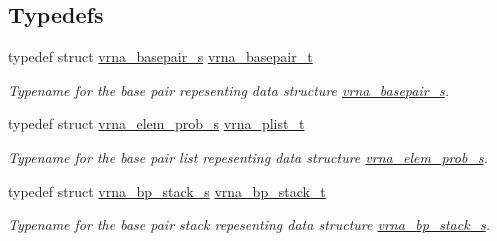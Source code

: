 \subsection*{Typedefs}
\begin{DoxyCompactItemize}
\item 
\mbox{\label{group__data__structures_gac8c5669d3fb813cacf506489689305ce}} 
typedef struct \hyperlink{group__data__structures_structvrna__basepair__s}{vrna\+\_\+basepair\+\_\+s} \hyperlink{group__data__structures_gac8c5669d3fb813cacf506489689305ce}{vrna\+\_\+basepair\+\_\+t}
\begin{DoxyCompactList}\small\item\em Typename for the base pair repesenting data structure \hyperlink{group__data__structures_structvrna__basepair__s}{vrna\+\_\+basepair\+\_\+s}. \end{DoxyCompactList}\item 
\mbox{\label{group__data__structures_ga5bd6f0d16685b1249b7c3b73049dd5dc}} 
typedef struct \hyperlink{group__struct__utils_structvrna__elem__prob__s}{vrna\+\_\+elem\+\_\+prob\+\_\+s} \hyperlink{group__data__structures_ga5bd6f0d16685b1249b7c3b73049dd5dc}{vrna\+\_\+plist\+\_\+t}
\begin{DoxyCompactList}\small\item\em Typename for the base pair list repesenting data structure \hyperlink{group__struct__utils_structvrna__elem__prob__s}{vrna\+\_\+elem\+\_\+prob\+\_\+s}. \end{DoxyCompactList}\item 
\mbox{\label{group__data__structures_gaa651bda42e7692f08cb603cd6834b0ee}} 
typedef struct \hyperlink{group__data__structures_structvrna__bp__stack__s}{vrna\+\_\+bp\+\_\+stack\+\_\+s} \hyperlink{group__data__structures_gaa651bda42e7692f08cb603cd6834b0ee}{vrna\+\_\+bp\+\_\+stack\+\_\+t}
\begin{DoxyCompactList}\small\item\em Typename for the base pair stack repesenting data structure \hyperlink{group__data__structures_structvrna__bp__stack__s}{vrna\+\_\+bp\+\_\+stack\+\_\+s}. \end{DoxyCompactList}\item 
\mbox{\label{group__data__structures_gae4fc91141cc69c6d8eaf1332cb991ecc}} 

\end{DoxyCompactItemize}

